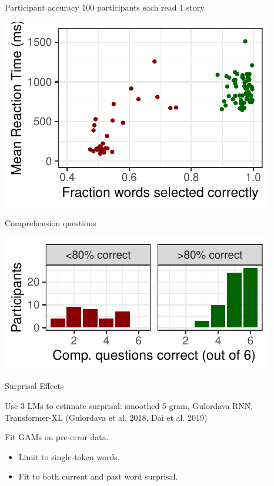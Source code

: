 \documentclass[12pt, xcolor=beamer,table,usenames,dvipsnames, ignorenonframetext, ngerman]{beamer}
\begin{document}
\begin{frame}{Participant accuracy}
100 participants each read 1 story \pause
\begin{center}
\includegraphics[width=.8\textwidth]{error.pdf}
\end{center}
\end{frame}
\begin{frame}{Comprehension questions}
\begin{center} \pause
\includegraphics[width=.8\textwidth]{comp.pdf}
\end{center}
\end{frame}



\begin{frame}{Surprisal Effects}

Use 3 LMs to estimate surprisal: smoothed 5-gram, Gulordava RNN, Transformer-XL (Gulordava et al. 2018, Dai et al. 2019)
\pause

Fit GAMs on pre-error data.
\begin{itemize}
	\item Limit to single-token words.
	\item Fit to both current and past word surprisal.
\end{itemize}

\end{frame}
\end{document}
